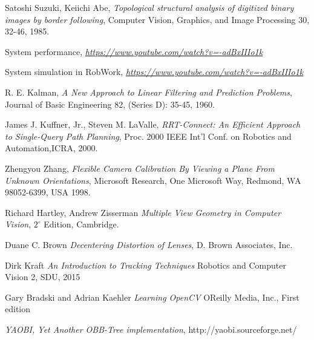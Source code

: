 \begin{thebibliography}{9}

	Satoshi Suzuki, Keiichi Abe,
	\emph{Topological structural analysis of digitized binary images by border following},
	Computer Vision, Graphics, and Image Processing 30, 32-46,
	1985.

	System performance,
	\emph{\url{https://www.youtube.com/watch?v=-adBxIIIo1k}}

	System simulation in RobWork,
	\emph{\url{https://www.youtube.com/watch?v=-adBxIIIo1k}}

	R. E. Kalman,
	\emph{A New Approach to Linear Filtering and Prediction Problems},
	Journal of Basic Engineering 82, (Series D): 35-45,
	1960.

	James J. Kuffner, Jr., Steven M. LaValle,
	\emph{RRT-Connect: An Efficient Approach to Single-Query Path Planning},
	Proc. 2000 IEEE Int’l Conf. on Robotics and Automation,ICRA, 2000.

	Zhengyou Zhang,
	\emph{Flexible Camera Calibration By Viewing a Plane From Unknown Orientations},
	Microsoft Research, One Microsoft Way, Redmond, WA 98052-6399, USA
	1998.

	Richard Hartley, Andrew Zisserman
	\emph{Multiple View Geometry in Computer Vision},
	$2^{\circ}$ Edition, Cambridge.

	Duane C. Brown
	\emph{Decentering Distortion of Lenses},
	D. Brown Associates, Inc.

	Dirk Kraft
	\emph{An Introduction to Tracking Techniques}
	Robotics and Computer Vision 2, SDU, 2015

	Gary Bradski and Adrian Kaehler
	\emph{Learning OpenCV}
	OReilly Media, Inc., First edition

	\emph{YAOBI, Yet Another OBB-Tree implementation},
	http://yaobi.sourceforge.net/

\end{thebibliography}
